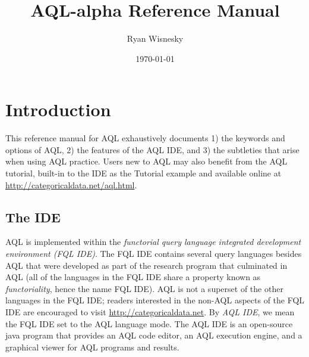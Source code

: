\documentclass[10pt]{book}
\begin{document}
\title{AQL-alpha Reference Manual}
\author{Ryan Wisnesky}
\date{\today}
\maketitle

\tableofcontents

\newpage
\chapter{Introduction}

This reference manual for AQL exhaustively documents 1) the keywords and options of AQL, 2) the features of the AQL IDE, and 3) the subtleties that arise when using AQL practice.  Users new to AQL may also benefit from the AQL tutorial, built-in to the IDE as the Tutorial example and available online at    \url{http://categoricaldata.net/aql.html}.


\section{The IDE}
AQL is implemented within the {\it functorial query language integrated development environment (FQL IDE)}.  The FQL IDE contains several query languages besides AQL that were developed as part of the research program that culminated in AQL  (all of the languages in the FQL IDE share a property known as {\it functoriality}, hence the name FQL IDE).  AQL is not a superset of the other languages in the FQL IDE; readers interested in the non-AQL aspects of the FQL IDE are encouraged to visit \url{http://categoricaldata.net}.  By {\it AQL IDE}, we mean the FQL IDE set to the AQL language mode.  The AQL IDE is an open-source java program that provides an AQL code editor, an AQL execution engine, and a graphical viewer for AQL programs and results.   
\end{document}
